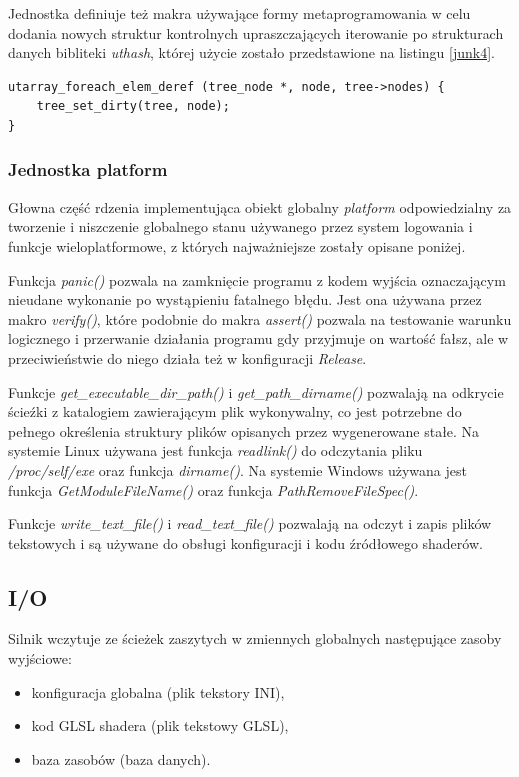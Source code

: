 Jednostka definiuje też makra używające formy metaprogramowania w celu dodania nowych struktur kontrolnych \cite{METACONTROLC} upraszczających iterowanie po strukturach danych bibliteki \textit{uthash}, której użycie zostało przedstawione na listingu \ref{junk4}.
\lstset{language=C}
\begin{lstlisting}[caption={Przykład iteracji używając makra utarray\_foreach\_elem\_deref},captionpos=b,label={junk4}]
utarray_foreach_elem_deref (tree_node *, node, tree->nodes) {
	tree_set_dirty(tree, node);
}
\end{lstlisting}


\subsubsection{Jednostka platform}
Głowna część rdzenia implementująca obiekt globalny \textit{platform} odpowiedzialny za tworzenie i niszczenie globalnego stanu używanego przez system logowania i funkcje wieloplatformowe, z których najważniejsze zostały opisane poniżej.

Funkcja \textit{panic()} pozwala na zamknięcie programu z kodem wyjścia oznaczającym nieudane wykonanie po wystąpieniu fatalnego błędu.
Jest ona używana przez makro \textit{verify()}, które podobnie do makra \textit{assert()} pozwala na testowanie warunku logicznego i przerwanie działania programu gdy przyjmuje on wartość fałsz, ale w przeciwieństwie do niego działa też w konfiguracji \textit{Release}.

Funkcje \textit{get\_executable\_dir\_path()} i \textit{get\_path\_dirname()} pozwalają na odkrycie ścieźki z katalogiem zawierającym plik wykonywalny, co jest potrzebne do pełnego określenia struktury plików opisanych przez wygenerowane stałe.
Na systemie Linux używana jest funkcja \textit{readlink()} do odczytania pliku \textit{/proc/self/exe}
oraz funkcja \textit{dirname()}.
Na systemie Windows używana jest funkcja \textit{GetModuleFileName()} oraz funkcja \textit{PathRemoveFileSpec()}.

Funkcje \textit{write\_text\_file()} i \textit{read\_text\_file()} pozwalają na odczyt i zapis plików tekstowych i są używane do obsługi konfiguracji i kodu źródłowego shaderów.

\subsection{I/O}

Silnik wczytuje ze ścieżek zaszytych w zmiennych globalnych następujące zasoby wyjściowe:
\begin{itemize}
	\item konfiguracja globalna (plik tekstory INI),
	\item kod GLSL shadera (plik tekstowy GLSL),
	\item baza zasobów (baza danych).
\end{itemize}

